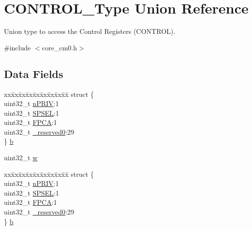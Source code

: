 \hypertarget{union_c_o_n_t_r_o_l___type}{}\section{C\+O\+N\+T\+R\+O\+L\+\_\+\+Type Union Reference}
\label{union_c_o_n_t_r_o_l___type}


Union type to access the Control Registers (C\+O\+N\+T\+R\+OL).  




{\ttfamily \#include $<$core\+\_\+cm0.\+h$>$}

\subsection*{Data Fields}
\begin{DoxyCompactItemize}
\item 
\begin{tabbing}
xx\=xx\=xx\=xx\=xx\=xx\=xx\=xx\=xx\=\kill
struct \{\\
\>uint32\_t \mbox{\hyperlink{union_c_o_n_t_r_o_l___type_a2a6e513e8a6bf4e58db169e312172332}{nPRIV}}:1\\
\>uint32\_t \mbox{\hyperlink{union_c_o_n_t_r_o_l___type_ae185aac93686ffc78e998a9daf41415b}{SPSEL}}:1\\
\>uint32\_t \mbox{\hyperlink{union_c_o_n_t_r_o_l___type_a2518558c090f60161ba4e718a54ee468}{FPCA}}:1\\
\>uint32\_t \mbox{\hyperlink{union_c_o_n_t_r_o_l___type_ac8a6a13838a897c8d0b8bc991bbaf7c1}{\_reserved0}}:29\\
\} \mbox{\hyperlink{union_c_o_n_t_r_o_l___type_ab2a41711c248a319c2e7d0ab73c3a8b9}{b}}\\

\end{tabbing}\item 
uint32\+\_\+t \mbox{\hyperlink{union_c_o_n_t_r_o_l___type_ad0fb62e7a08e70fc5e0a76b67809f84b}{w}}
\item 
\begin{tabbing}
xx\=xx\=xx\=xx\=xx\=xx\=xx\=xx\=xx\=\kill
struct \{\\
\>uint32\_t \mbox{\hyperlink{union_c_o_n_t_r_o_l___type_a2a6e513e8a6bf4e58db169e312172332}{nPRIV}}:1\\
\>uint32\_t \mbox{\hyperlink{union_c_o_n_t_r_o_l___type_ae185aac93686ffc78e998a9daf41415b}{SPSEL}}:1\\
\>uint32\_t \mbox{\hyperlink{union_c_o_n_t_r_o_l___type_a2518558c090f60161ba4e718a54ee468}{FPCA}}:1\\
\>uint32\_t \mbox{\hyperlink{union_c_o_n_t_r_o_l___type_ac8a6a13838a897c8d0b8bc991bbaf7c1}{\_reserved0}}:29\\
\} \mbox{\hyperlink{union_c_o_n_t_r_o_l___type_a362f58ce033c684dddd5ae69c5417ef5}{b}}\\


\end{tabbing}
\end{DoxyCompactItemize}
